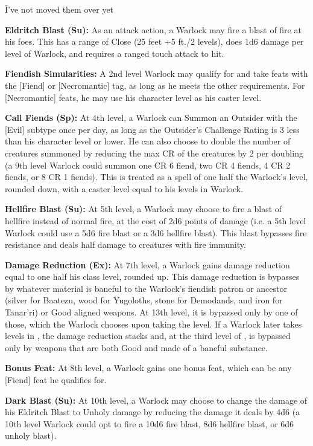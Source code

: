 \^ I've not moved them over yet

\textbf{Eldritch Blast (Su):} As an attack action, a Warlock may fire a blast of fire at his foes. This has a range of Close (25 feet +5 ft./2 levels), does 1d6 damage per level of Warlock, and requires a ranged touch attack to hit.

\textbf{Fiendish Simularities:} A 2nd level Warlock may qualify for and take feats with the [Fiend] or [Necromantic] tag, as long as he meets the other requirements. For [Necromantic] feats, he may use his character level as his caster level.

\textbf{Call Fiends (Sp):} At 4th level, a Warlock can Summon an Outsider with the [Evil] subtype once per day, as long as the Outsider's Challenge Rating is 3 less than his character level or lower. He can also choose to double the number of creatures summoned by reducing the max CR of the creatures by 2 per doubling (a 9th level Warlock could summon one CR 6 fiend, two CR 4 fiends, 4 CR 2 fiends, or 8 CR 1 fiends). This is treated as a spell of one half the Warlock's level, rounded down, with a caster level equal to his levels in Warlock.

\textbf{Hellfire Blast (Su):} At 5th level, a Warlock may choose to fire a blast of hellfire instead of normal fire, at the cost of 2d6 points of damage (i.e. a 5th level Warlock could use a 5d6 fire blast or a 3d6 hellfire blast). This blast bypasses fire resistance and deals half damage to creatures with fire immunity.

\textbf{Damage Reduction (Ex):} At 7th level, a Warlock gains damage reduction equal to one half his class level, rounded up. This damage reduction is bypasses by whatever material is baneful to the Warlock's fiendish patron or ancestor (silver for Baatezu, wood for Yugoloths, stone for Demodands, and iron for Tanar'ri) or Good aligned weapons. At 13th level, it is bypassed only by one of those, which the Warlock chooses upon taking the level. If a Warlock later takes levels in , the damage reduction stacks and, at the third level of , is bypassed only by weapons that are both Good and made of a baneful substance.

\textbf{Bonus Feat:} At 8th level, a Warlock gains one bonus feat, which can be any [Fiend] feat he qualifies for.

\textbf{Dark Blast (Su):} At 10th level, a Warlock may choose to change the damage of his Eldritch Blast to Unholy damage by reducing the damage it deals by 4d6 (a 10th level Warlock could opt to fire a 10d6 fire blast, 8d6 hellfire blast, or 6d6 unholy blast).

